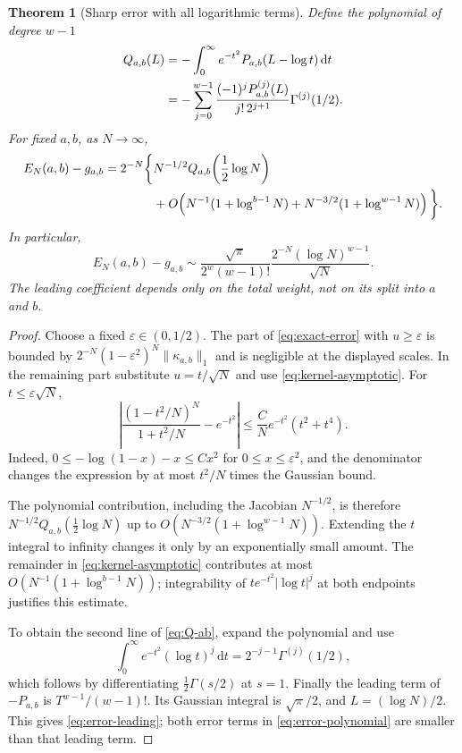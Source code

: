 \documentclass[11pt,a4paper]{article}
\numberwithin{equation}{section}
\newtheorem{theorem}{Theorem}[section]
\theoremstyle{definition}
\theoremstyle{remark}
\newcommand{\dd}{\,\mathrm{d}}
\begin{document}
\begin{theorem}[Sharp error with all logarithmic terms]\label{thm:error-polynomial}
Define the polynomial of degree $w-1$
\begin{align}\label{eq:Q-ab}
 Q_{a,b}(L)
 &=-\int_0^\infty e^{-t^2}P_{a,b}(L-\log t)\dd t\notag\\
 &=-\sum_{j=0}^{w-1}\frac{(-1)^jP_{a,b}^{(j)}(L)}{j!\,2^{j+1}}
       \Gamma^{(j)}(1/2).
\end{align}
For fixed $a,b$, as $N\to\infty$,
\begin{align}\label{eq:error-polynomial}
 E_N(a,b)-g_{a,b}=2^{-N}\bigg\{&N^{-1/2}Q_{a,b}\!\left(\frac12\log N\right)\notag\\
 &+O\!\left(N^{-1}(1+\log^{b-1}N)
       +N^{-3/2}(1+\log^{w-1}N)\right)\bigg\}.
\end{align}
In particular,
\begin{equation}\label{eq:error-leading}
 E_N(a,b)-g_{a,b}\sim
 \frac{\sqrt\pi}{2^w(w-1)!}
 \frac{2^{-N}(\log N)^{w-1}}{\sqrt N}.
\end{equation}
The leading coefficient depends only on the total weight, not on its split into $a$ and $b$.
\end{theorem}
\begin{proof}
Choose a fixed $\varepsilon\in(0,1/2)$. The part of \eqref{eq:exact-error} with $u\ge\varepsilon$ is bounded by
$2^{-N}(1-\varepsilon^2)^N\|\kappa_{a,b}\|_1$ and is negligible at the displayed scales. In the remaining part substitute $u=t/\sqrt N$ and use \eqref{eq:kernel-asymptotic}. For $t\le\varepsilon\sqrt N$,
\[
 \left|\frac{(1-t^2/N)^N}{1+t^2/N}-e^{-t^2}\right|
 \le\frac{C}{N}e^{-t^2}(t^2+t^4).
\]
Indeed, $0\le-\log(1-x)-x\le Cx^2$ for $0\le x\le\varepsilon^2$, and the denominator changes the expression by at most $t^2/N$ times the Gaussian bound.

The polynomial contribution, including the Jacobian $N^{-1/2}$, is therefore
$N^{-1/2}Q_{a,b}(\tfrac12\log N)$ up to
$O(N^{-3/2}(1+\log^{w-1}N))$. Extending the $t$ integral to infinity changes it only by an exponentially small amount. The remainder in \eqref{eq:kernel-asymptotic} contributes at most
$O(N^{-1}(1+\log^{b-1}N))$; integrability of $t e^{-t^2}|\log t|^j$ at both endpoints justifies this estimate.

To obtain the second line of \eqref{eq:Q-ab}, expand the polynomial and use
\[
 \int_0^\infty e^{-t^2}(\log t)^j\dd t
 =2^{-j-1}\Gamma^{(j)}(1/2),
\]
which follows by differentiating $\tfrac12\Gamma(s/2)$ at $s=1$. Finally the leading term of $-P_{a,b}$ is $T^{w-1}/(w-1)!$. Its Gaussian integral is $\sqrt\pi/2$, and $L=(\log N)/2$. This gives \eqref{eq:error-leading}; both error terms in \eqref{eq:error-polynomial} are smaller than that leading term.
\end{proof}
\end{document}
